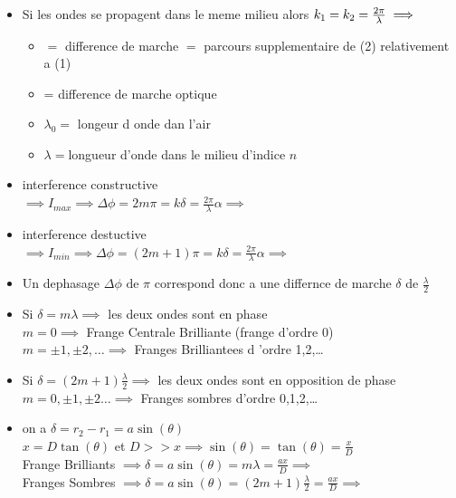 \documentclass[12pt]{book}
\begin{document}
\begin{itemize}
\begin{itemize}
                    \end{itemize}
                \item Si les ondes se propagent dans le meme milieu alors $k_1 = k_2=\frac{2\pi}{\lambda} \\ \implies $
                    \begin{itemize}
                        \item {}$ = $ difference de marche $=$ parcours supplementaire de (2) relativement a (1) 
                        \item {} = difference de marche optique 
                        \item $\lambda_0 =$ longeur d onde dan l'air 
                        \item $\lambda = $longueur d'onde dans le milieu d'indice $n$
                    \end{itemize}
                \item interference constructive \\
                    $\implies I_{max}\implies\Delta\phi=2m\pi=k\delta=\frac{2\pi}{\lambda}\alpha\implies$
                \item interference destuctive \\
                     $\implies I_{min}\implies\Delta\phi=(2m+1)\pi=k\delta=\frac{2\pi}{\lambda}\alpha\implies$
                \item Un dephasage $\Delta\phi\text{ de }\pi$ correspond donc a une differnce de marche $\delta$ de $\frac{\lambda}{2}$
                \item Si $\delta = m\lambda \implies $ les deux ondes sont en phase \\
                    $m=0 \implies$ Frange Centrale Brilliante (frange d'ordre 0) \\
                    $m = \pm 1 , \pm 2 , \ldots \implies $ Franges Brilliantees d 'ordre 1,2,\ldots
                \item Si $\delta = (2m+1)\frac{\lambda}{2} \implies $ les deux ondes sont en opposition de phase \\
                    $m = 0 ,\pm1 ,\pm2 \ldots \implies$ Franges sombres d'ordre 0,1,2,\ldots 
                \item on a $\delta = r_2 -r_1 = a\sin(\theta)$ \\
                    $x=D\tan(\theta)$ et $D >> x \implies \sin(\theta) =\tan(\theta) = \frac{x}{D}$ \\
                    Frange Brilliants $\implies \delta = a\sin(\theta) = m\lambda = \frac{ax}{D}\implies$\\
                    Franges Sombres $\implies \delta=a\sin(\theta)=(2m+1)\frac{\lambda}{2}=\frac{ax}{D}\implies $                    

                
            \end{itemize}
\end{document}
